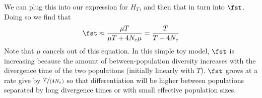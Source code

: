 We can plug this into our expression for $H_T$, and then that in turn
into $\fst$. Doing so we find that
\begin{equation}
\fst \approx \frac{ \mu T}{\mu T +  4N_e\mu }  = \frac{ T}{ T +  4N_e
} \label{eqn:FST_split}
\end{equation}
Note that $\mu$ cancels out of this equation. In this simple toy model, $\fst$
is increasing because the amount of between-population diversity
increases with the divergence time of the two populations (initially
linearly with $T$). $\fst$ grows at a rate
give by $\nicefrac{T}{(4N_e)}$ so that differentiation will be higher
between populations separated by long divergence times or with small
effective population sizes.

